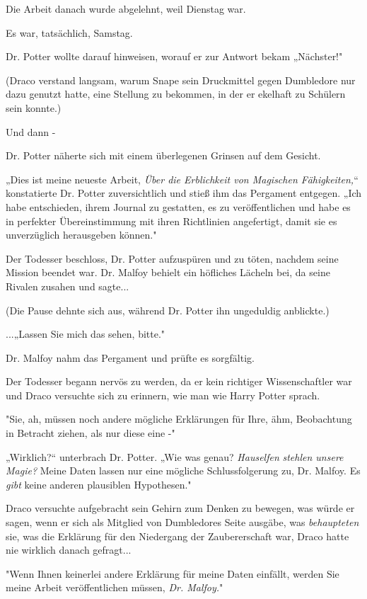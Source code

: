 {Die Arbeit danach wurde abgelehnt, weil Dienstag war.

Es war, tatsächlich, Samstag.

Dr. Potter wollte darauf hinweisen, worauf er zur Antwort bekam „Nächster!"

(Draco verstand langsam, warum Snape sein Druckmittel gegen Dumbledore nur dazu genutzt hatte, eine Stellung zu bekommen, in der er ekelhaft zu Schülern sein konnte.)

Und dann -

Dr. Potter näherte sich mit einem überlegenen Grinsen auf dem Gesicht.

„Dies ist meine neueste Arbeit, \emph{Über die Erblichkeit von Magischen Fähigkeiten,}“ konstatierte Dr. Potter zuversichtlich und stieß ihm das Pergament entgegen. „Ich habe entschieden, ihrem Journal zu gestatten, es zu veröffentlichen und habe es in perfekter Übereinstimmung mit ihren Richtlinien angefertigt, damit sie es unverzüglich herausgeben können."

Der Todesser beschloss, Dr. Potter aufzuspüren und zu töten, nachdem seine Mission beendet war. Dr. Malfoy behielt ein höfliches Lächeln bei, da seine Rivalen zusahen und sagte...

(Die Pause dehnte sich aus, während Dr. Potter ihn ungeduldig anblickte.)

...„Lassen Sie mich das sehen, bitte."

Dr. Malfoy nahm das Pergament und prüfte es sorgfältig.

Der Todesser begann nervös zu werden, da er kein richtiger Wissenschaftler war und Draco versuchte sich zu erinnern, wie man wie Harry Potter sprach.

"Sie, ah, müssen noch andere mögliche Erklärungen für Ihre, ähm, Beobachtung in Betracht ziehen, als nur diese eine -"

„Wirklich?“ unterbrach Dr. Potter. „Wie was genau? \emph{Hauselfen} \emph{stehlen unsere Magie?} Meine Daten lassen nur eine mögliche Schlussfolgerung zu, Dr. Malfoy. Es \emph{gibt} keine anderen plausiblen Hypothesen."

Draco versuchte aufgebracht sein Gehirn zum Denken zu bewegen, was würde er sagen, wenn er sich als Mitglied von Dumbledores Seite ausgäbe, was \emph{behaupteten} sie, was die Erklärung für den Niedergang der Zaubererschaft war, Draco hatte nie wirklich danach gefragt...

"Wenn Ihnen keinerlei andere Erklärung für meine Daten einfällt, werden Sie meine Arbeit veröffentlichen müssen, \emph{Dr. Malfoy.}"

}
